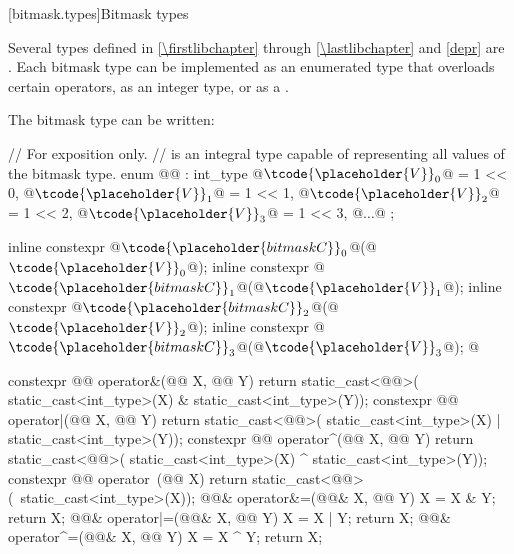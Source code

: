 [bitmask.types]{Bitmask types}

\pnum
Several types defined in \ref{\firstlibchapter} through \ref{\lastlibchapter}
and \ref{depr} are
.
Each bitmask type can be implemented as an
enumerated type that overloads certain operators, as an integer type,
or as a
.
%

\pnum
The bitmask type  can be written:
\begin{codeblock}
// For exposition only.
//  is an integral type capable of representing all values of the bitmask type.
enum @@ : int_type {
  @$\tcode{\placeholder{V}}_{0}$@ = 1 << 0, @$\tcode{\placeholder{V}}_{1}$@ = 1 << 1, @$\tcode{\placeholder{V}}_{2}$@ = 1 << 2, @$\tcode{\placeholder{V}}_{3}$@ = 1 << 3, @$\ldots$@
};

inline constexpr @$\tcode{\placeholder{bitmask C}}_{0}$@(@$\tcode{\placeholder{V}}_{0}{}$@);
inline constexpr @$\tcode{\placeholder{bitmask C}}_{1}$@(@$\tcode{\placeholder{V}}_{1}{}$@);
inline constexpr @$\tcode{\placeholder{bitmask C}}_{2}$@(@$\tcode{\placeholder{V}}_{2}{}$@);
inline constexpr @$\tcode{\placeholder{bitmask C}}_{3}$@(@$\tcode{\placeholder{V}}_{3}{}$@);
  @\vdots@

constexpr @@ operator&(@@ X, @@ Y) {
  return static_cast<@@>(
    static_cast<int_type>(X) & static_cast<int_type>(Y));
}
constexpr @@ operator|(@@ X, @@ Y) {
  return static_cast<@@>(
    static_cast<int_type>(X) | static_cast<int_type>(Y));
}
constexpr @@ operator^(@@ X, @@ Y) {
  return static_cast<@@>(
    static_cast<int_type>(X) ^ static_cast<int_type>(Y));
}
constexpr @@ operator~(@@ X) {
  return static_cast<@@>(~static_cast<int_type>(X));
}
@@& operator&=(@@& X, @@ Y) {
  X = X & Y; return X;
}
@@& operator|=(@@& X, @@ Y) {
  X = X | Y; return X;
}
@@& operator^=(@@& X, @@ Y) {
  X = X ^ Y; return X;
}
\end{codeblock}

